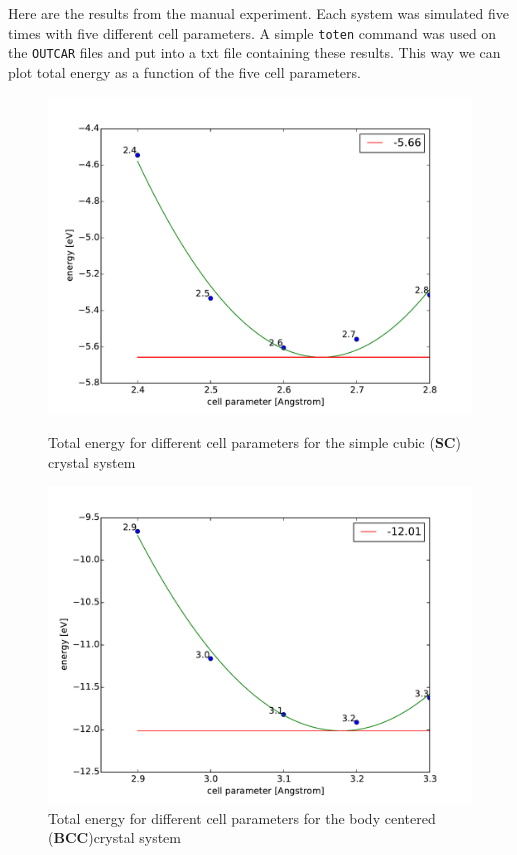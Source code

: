 \documentclass[a4paper,10pt]{article}
\begin{document}
  Here are the results from the manual experiment. Each system was simulated five times with five different cell parameters. A simple \texttt{toten} command was used on the \texttt{OUTCAR} files and put into a txt file containing these results. This way we can plot total energy as a function of the five cell parameters.
\begin{figure}[H]
	\centering
	
	\includegraphics[width=0.7\linewidth]{sc}
	\caption{Total energy for different cell parameters for the simple cubic (\textbf{SC}) crystal system}
	\label{fig:sc}
	
	\includegraphics[width=0.7\linewidth]{bcc}
	\caption{Total energy for different cell parameters for the body centered (\textbf{BCC})crystal system}
	\label{fig:bcc}
\end{figure}
\end{document}

